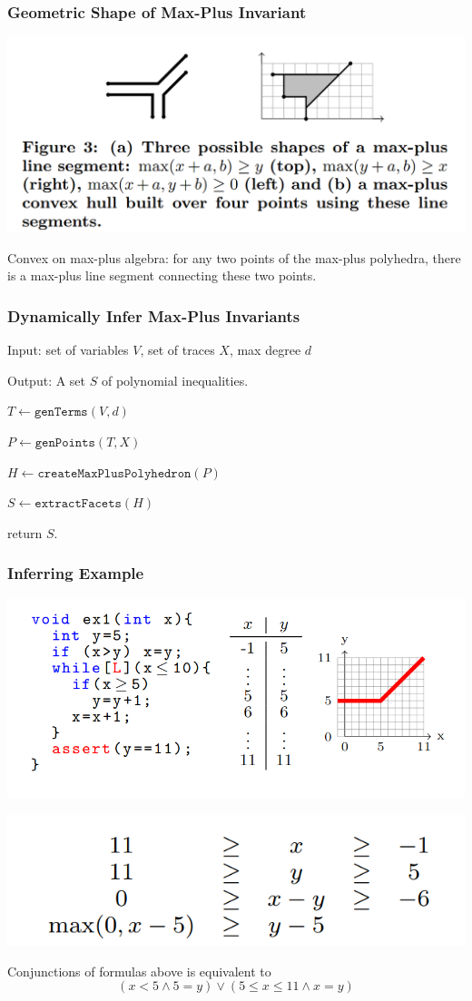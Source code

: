 \documentclass[11pt]{beamer}
\begin{document}
\begin{frame}\frametitle{Geometric Shape of Max-Plus Invariant}
\begin{center}
\includegraphics[scale=0.27]{3.png}
\end{center}
Convex on max-plus algebra: for any two points of the max-plus polyhedra, there is a max-plus line segment connecting these two points.
\end{frame}

\begin{frame}\frametitle{Dynamically Infer Max-Plus Invariants }
Input: set of variables $V$, set of traces $X$, max degree $d$

Output: A set $S$ of polynomial inequalities.

$T \leftarrow \texttt{genTerms}(V,d)$

$P \leftarrow \texttt{genPoints}(T,X)$

$H \leftarrow \texttt{createMaxPlusPolyhedron}(P)$

$S\leftarrow \texttt{extractFacets}(H)$

return $S$.
\end{frame}

\begin{frame}\frametitle{Inferring Example}
\includegraphics[scale=0.24]{1.png}
\begin{center}
\includegraphics[scale=0.34]{4.png}
\end{center}
Conjunctions of formulas above is equivalent to 
\[(x < 5 \wedge 5 = y) \vee (5 \le x \le 11 \wedge x = y)\]
\end{frame}
\end{document}
